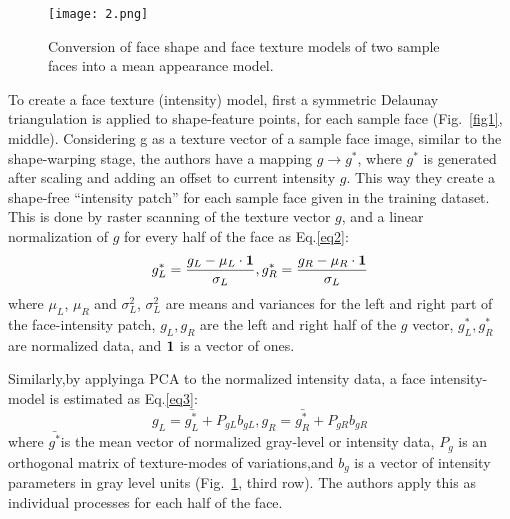 \documentclass[10pt,twocolumn,letterpaper]{article}
\begin{document}
\begin{figure}[t]
  \centering
  \texttt{[image: 2.png]}\\
  \caption{Conversion of face shape and face texture models of two sample faces into a mean appearance model.}
  \label{fig2}
\end{figure}
\par
To create a face texture (intensity) model, first a symmetric Delaunay triangulation is applied to shape-feature points, for each sample face (Fig.~\ref{fig1}, middle). Considering g as a texture vector of a sample face image, similar to the shape-warping stage, the authors have a mapping $g\rightarrow g^{\ast}$, where $g^{\ast}$ is generated after scaling and adding an offset to current intensity $g$. This way they create a shape-free ``intensity patch'' for each sample face given in the training dataset. This is done by raster scanning of the texture vector $g$, and a linear normalization of $g$ for every half of the face as Eq.\ref{eq2}:
\begin{equation}
g_L^{\ast}=\frac{g_L-\mu_L \cdot \bf{1}}{\sigma_L},g_R^{\ast}=\frac{g_R-\mu_R \cdot \bf{1}}{\sigma_L}
\label{eq2}
\end{equation}
where $\mu_L$, $\mu_R$ and $\sigma_L^2$, $\sigma_L^2$ are means and variances for the left and right part of the face-intensity patch, $g_L, g_R$ are the left and right half of the $g$ vector, $g_L^\ast, g_R^\ast$ are normalized data, and $\bf{1}$ is a vector of ones.
\par
Similarly,by applyinga PCA to the normalized intensity data, a face intensity-model is estimated as Eq.\ref{eq3}:
\begin{equation}
g_L=\bar{g_L^\ast}+P_{gL}b_{gL},g_R=\bar{g_R^\ast}+P_{gR}b_{gR}
\label{eq3}
\end{equation}
where $\bar{g^\ast}$is the mean vector of normalized gray-level or intensity data, $P_g$ is an orthogonal matrix of texture-modes of variations,and $b_g$ is a vector of intensity parameters in gray level units (Fig.~\ref{fig2}, third row). The authors apply this as individual processes for each half of the face.

{\small


}
\end{document}
